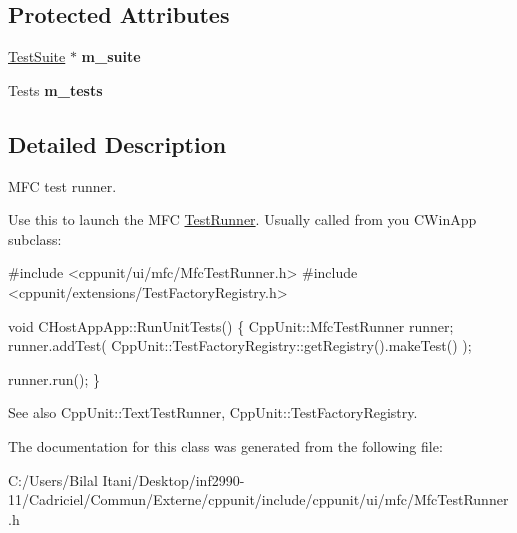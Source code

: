 \subsection*{Protected Attributes}
\begin{DoxyCompactItemize}
\item 
\hyperlink{class_test_suite}{Test\+Suite} $\ast$ {\bfseries m\+\_\+suite}\hypertarget{class_mfc_test_runner_a7700f0b285e70f42f3e84b56be890658}{}\label{class_mfc_test_runner_a7700f0b285e70f42f3e84b56be890658}

\item 
Tests {\bfseries m\+\_\+tests}\hypertarget{class_mfc_test_runner_a041d453efb2f9e262676f1d68f1c22af}{}\label{class_mfc_test_runner_a041d453efb2f9e262676f1d68f1c22af}

\end{DoxyCompactItemize}


\subsection{Detailed Description}
M\+FC test runner.

Use this to launch the M\+FC \hyperlink{class_test_runner}{Test\+Runner}. Usually called from you C\+Win\+App subclass\+: 


\begin{DoxyCode}
\textcolor{preprocessor}{#include <cppunit/ui/mfc/MfcTestRunner.h>}
\textcolor{preprocessor}{#include <cppunit/extensions/TestFactoryRegistry.h>}

\textcolor{keywordtype}{void} 
CHostAppApp::RunUnitTests()
\{
  CppUnit::MfcTestRunner runner;
  runner.addTest( CppUnit::TestFactoryRegistry::getRegistry().makeTest() );

  runner.run();    
\}
\end{DoxyCode}
 \begin{DoxySeeAlso}{See also}
Cpp\+Unit\+::\+Text\+Test\+Runner, Cpp\+Unit\+::\+Test\+Factory\+Registry. 
\end{DoxySeeAlso}


The documentation for this class was generated from the following file\+:\begin{DoxyCompactItemize}
\item 
C\+:/\+Users/\+Bilal Itani/\+Desktop/inf2990-\/11/\+Cadriciel/\+Commun/\+Externe/cppunit/include/cppunit/ui/mfc/Mfc\+Test\+Runner.\+h\end{DoxyCompactItemize}
